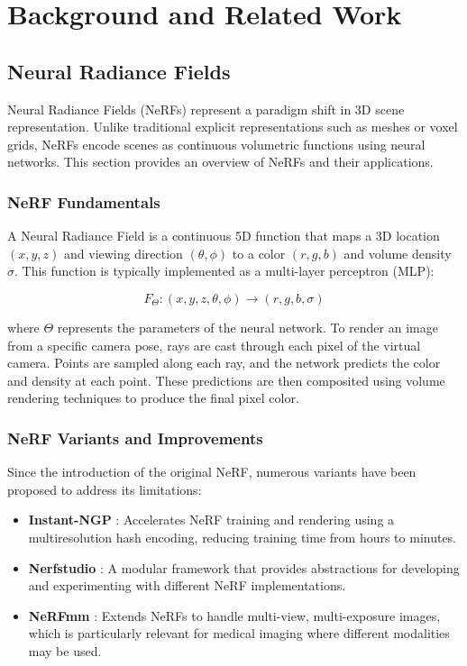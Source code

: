 \chapter{Background and Related Work}

\section{Neural Radiance Fields}
Neural Radiance Fields (NeRFs) \cite{mildenhall2020nerf} represent a paradigm shift in 3D scene representation. Unlike traditional explicit representations such as meshes or voxel grids, NeRFs encode scenes as continuous volumetric functions using neural networks. This section provides an overview of NeRFs and their applications.

\subsection{NeRF Fundamentals}
A Neural Radiance Field is a continuous 5D function that maps a 3D location $(x, y, z)$ and viewing direction $(\theta, \phi)$ to a color $(r, g, b)$ and volume density $\sigma$. This function is typically implemented as a multi-layer perceptron (MLP):

\begin{equation}
F_\Theta: (x, y, z, \theta, \phi) \rightarrow (r, g, b, \sigma)
\end{equation}

where $\Theta$ represents the parameters of the neural network. To render an image from a specific camera pose, rays are cast through each pixel of the virtual camera. Points are sampled along each ray, and the network predicts the color and density at each point. These predictions are then composited using volume rendering techniques to produce the final pixel color.

\subsection{NeRF Variants and Improvements}
Since the introduction of the original NeRF, numerous variants have been proposed to address its limitations:

\begin{itemize}
    \item \textbf{Instant-NGP} \cite{muller2022instant}: Accelerates NeRF training and rendering using a multiresolution hash encoding, reducing training time from hours to minutes.
    
    \item \textbf{Nerfstudio} \cite{tancik2023nerfstudio}: A modular framework that provides abstractions for developing and experimenting with different NeRF implementations.
    
    \item \textbf{NeRFmm} \cite{wang2021nerfmm}: Extends NeRFs to handle multi-view, multi-exposure images, which is particularly relevant for medical imaging where different modalities may be used.
\end{itemize}

